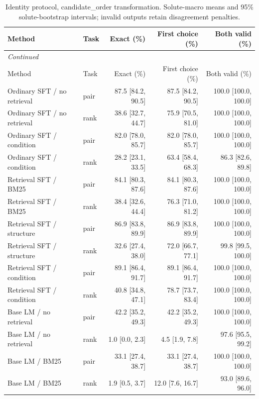 \begingroup\footnotesize
\setlength{\tabcolsep}{3pt}
\begin{longtable}{p{.26\linewidth}lrrr}
\caption{Identity protocol, candidate\_order transformation. Solute-macro means and 95\% solute-bootstrap intervals; invalid outputs retain disagreement penalties.}\label{tab:consistency-identity-candidate-order}\\
\toprule
Method & Task & Exact (\%) & First choice (\%) & Both valid (\%) \\
\midrule
\endfirsthead
\multicolumn{5}{l}{\textit{Continued}} \\
\toprule
Method & Task & Exact (\%) & First choice (\%) & Both valid (\%) \\
\midrule
\endhead
Ordinary SFT / no retrieval & pair & 87.5 [84.2, 90.5] & 87.5 [84.2, 90.5] & 100.0 [100.0, 100.0] \\
Ordinary SFT / no retrieval & rank & 38.6 [32.7, 44.7] & 75.9 [70.5, 81.0] & 100.0 [100.0, 100.0] \\
Ordinary SFT / condition & pair & 82.0 [78.0, 85.7] & 82.0 [78.0, 85.7] & 100.0 [100.0, 100.0] \\
Ordinary SFT / condition & rank & 28.2 [23.1, 33.5] & 63.4 [58.4, 68.3] & 86.3 [82.6, 89.8] \\
Retrieval SFT / BM25 & pair & 84.1 [80.3, 87.6] & 84.1 [80.3, 87.6] & 100.0 [100.0, 100.0] \\
Retrieval SFT / BM25 & rank & 38.4 [32.6, 44.4] & 76.3 [71.0, 81.2] & 100.0 [100.0, 100.0] \\
Retrieval SFT / structure & pair & 86.9 [83.8, 89.9] & 86.9 [83.8, 89.9] & 100.0 [100.0, 100.0] \\
Retrieval SFT / structure & rank & 32.6 [27.4, 38.0] & 72.0 [66.7, 77.1] & 99.8 [99.5, 100.0] \\
Retrieval SFT / condition & pair & 89.1 [86.4, 91.7] & 89.1 [86.4, 91.7] & 100.0 [100.0, 100.0] \\
Retrieval SFT / condition & rank & 40.8 [34.8, 47.1] & 78.7 [73.7, 83.4] & 100.0 [100.0, 100.0] \\
Base LM / no retrieval & pair & 42.2 [35.2, 49.3] & 42.2 [35.2, 49.3] & 100.0 [100.0, 100.0] \\
Base LM / no retrieval & rank & 1.0 [0.0, 2.3] & 4.5 [1.9, 7.8] & 97.6 [95.5, 99.2] \\
Base LM / BM25 & pair & 33.1 [27.4, 38.7] & 33.1 [27.4, 38.7] & 100.0 [100.0, 100.0] \\
Base LM / BM25 & rank & 1.9 [0.5, 3.7] & 12.0 [7.6, 16.7] & 93.0 [89.6, 96.0] \\

\end{longtable}
